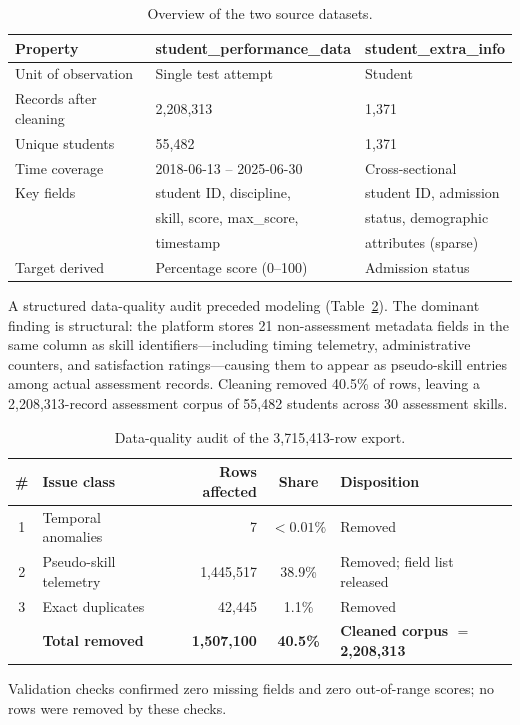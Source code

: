 \documentclass[11pt]{article}
\begin{document}
\begin{table}[ht]
\centering
\caption{Overview of the two source datasets.}
\label{tab:datasets}
\begin{tabular}{lll}
\toprule
\textbf{Property} & \textbf{student\_performance\_data} & \textbf{student\_extra\_info} \\
\midrule
Unit of observation & Single test attempt & Student \\
Records after cleaning & 2,208,313 & 1,371 \\
Unique students & 55,482 & 1,371 \\
Time coverage & 2018-06-13 -- 2025-06-30 & Cross-sectional \\
Key fields & student ID, discipline, & student ID, admission \\
 & skill, score, max\_score, & status, demographic \\
 & timestamp & attributes (sparse) \\
Target derived & Percentage score (0--100) & Admission status \\
\bottomrule
\end{tabular}
\end{table}

A structured data-quality audit preceded modeling (Table~\ref{tab:audit}).
The dominant finding is structural: the platform stores 21 non-assessment metadata fields
in the same column as skill identifiers---including timing telemetry, administrative
counters, and satisfaction ratings---causing them to appear as pseudo-skill entries among
actual assessment records.
Cleaning removed 40.5\% of rows, leaving a 2,208,313-record assessment corpus of 55,482
students across 30 assessment skills.

\begin{table}[ht]
\centering
\caption{Data-quality audit of the 3,715,413-row export.}
\label{tab:audit}
\begin{tabular}{clrcl}
\toprule
\textbf{\#} & \textbf{Issue class} & \textbf{Rows affected} & \textbf{Share} & \textbf{Disposition} \\
\midrule
1 & Temporal anomalies & 7 & ${<}0.01\%$ & Removed \\
2 & Pseudo-skill telemetry & 1,445,517 & 38.9\% & Removed; field list released \\
3 & Exact duplicates & 42,445 & 1.1\% & Removed \\
\midrule
  & \textbf{Total removed} & \textbf{1,507,100} & \textbf{40.5\%} & \textbf{Cleaned corpus $=$ 2,208,313} \\
\bottomrule
\end{tabular}
{\footnotesize Validation checks confirmed zero missing fields and zero out-of-range scores; no rows were removed by these checks.}
\end{table}
\end{document}

